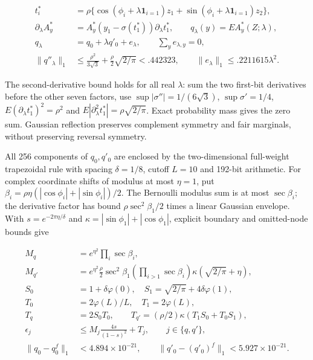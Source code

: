 \documentclass{article}
\begin{document}
\[
\begin{aligned}
t_i^*&=\rho\{\cos(\phi_i+\lambda\mathbf1_{i=1})z_1
+\sin(\phi_i+\lambda\mathbf1_{i=1})z_2\},\\
\partial_\lambda A_y^*&=A_y^*(y_1-\sigma(t_1^*))\partial_\lambda t_1^*,
\qquad q_\lambda(y)=E A_y^*(Z;\lambda),\\
q_\lambda&=q_0+\lambda q'_0+e_\lambda,\qquad
\sum_y e_{\lambda,y}=0,\\
\|q''_\lambda\|_1&\le\frac{\rho^2}{3\sqrt3}
+\frac\rho2\sqrt{2/\pi}<.442323,\qquad
\|e_\lambda\|_1\le .2211615\lambda^2.
\end{aligned}
\tag{I.56}
\]

The second-derivative bound holds for all real \(\lambda\): sum the two
first-bit derivatives before the other seven factors, use
\(\sup|\sigma''|=1/(6\sqrt3)\), \(\sup\sigma'=1/4\),
\(E(\partial_\lambda t_1^*)^2=\rho^2\) and
\(E|\partial_\lambda^2t_1^*|=\rho\sqrt{2/\pi}\). Exact probability mass
gives the zero sum. Gaussian reflection preserves complement symmetry
and fair marginals, without preserving reversal symmetry.

All 256 components of \(q_0,q'_0\) are enclosed by the two-dimensional
full-weight trapezoidal rule with spacing \(\delta=1/8\), cutoff
\(L=10\) and 192-bit arithmetic. For complex coordinate shifts of
modulus at most \(\eta=1\), put
\(\beta_i=\rho\eta(|\cos\phi_i|+|\sin\phi_i|)/2\). The Bernoulli modulus
sum is at most \(\sec\beta_i\); the derivative factor has bound
\(\rho\sec^2\beta_1/2\) times a linear Gaussian envelope. With
\(s=e^{-2\pi\eta/\delta}\) and \(\kappa=|\sin\phi_1|+|\cos\phi_1|\),
explicit boundary and omitted-node bounds give

\[
\begin{aligned}
M_q&=e^{\eta^2}\prod_i\sec\beta_i,\\
M_{q'}&=e^{\eta^2}\frac\rho2\sec^2\beta_1
\left(\prod_{i>1}\sec\beta_i\right)\kappa(\sqrt{2/\pi}+\eta),\\
S_0&=1+\delta\varphi(0),\quad S_1=\sqrt{2/\pi}+4\delta\varphi(1),\\
T_0&=2\varphi(L)/L,\quad T_1=2\varphi(L),\\
T_q&=2S_0T_0,\qquad T_{q'}=(\rho/2)\kappa(T_1S_0+T_0S_1),\\
\epsilon_j&\le M_j\frac{4s}{(1-s)^2}+T_j,\qquad j\in\{q,q'\},\\
\|q_0-q_0^f\|_1&<4.894\times10^{-21},\qquad
\|q'_0-(q'_0)^f\|_1<5.927\times10^{-21}.
\end{aligned}
\tag{I.57}
\]
\end{document}
